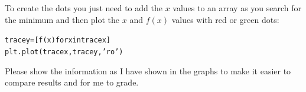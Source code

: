\begin{fullwidth}
\noindent {}

To create the dots you just need to add the $x$ values to an array as you search for the minimum and then plot the $x$ and $f(x)$ values with red or green dots:

\begin{alltt}
tracey = [f(x) for x in tracex]
plt.plot(tracex, tracey, 'ro')
\end{alltt}

Please show the information as I have shown in the graphs to make it easier to compare results and for me to grade.


\end{fullwidth}
